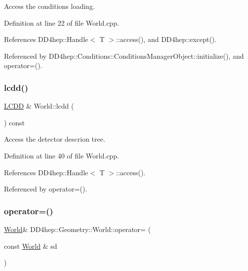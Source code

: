 Access the conditions loading. 



Definition at line 22 of file World.\+cpp.



References D\+D4hep\+::\+Handle$<$ T $>$\+::access(), and D\+D4hep\+::except().



Referenced by D\+D4hep\+::\+Conditions\+::\+Conditions\+Manager\+Object\+::initialize(), and operator=().

\hypertarget{class_d_d4hep_1_1_geometry_1_1_world_af4d8c997d8ada86ade18d953106dc301}{}\label{class_d_d4hep_1_1_geometry_1_1_world_af4d8c997d8ada86ade18d953106dc301} 
\subsubsection{\texorpdfstring{lcdd()}{lcdd()}}
{\footnotesize\ttfamily \hyperlink{class_d_d4hep_1_1_geometry_1_1_l_c_d_d}{L\+C\+DD} \& World\+::lcdd (\begin{DoxyParamCaption}{ }\end{DoxyParamCaption}) const}



Access the detector descrion tree. 



Definition at line 40 of file World.\+cpp.



References D\+D4hep\+::\+Handle$<$ T $>$\+::access().



Referenced by operator=().

\hypertarget{class_d_d4hep_1_1_geometry_1_1_world_a8bff84a367718e07ad1e34ac48711327}{}\label{class_d_d4hep_1_1_geometry_1_1_world_a8bff84a367718e07ad1e34ac48711327} 
\subsubsection{\texorpdfstring{operator=()}{operator=()}}
{\footnotesize\ttfamily \hyperlink{class_d_d4hep_1_1_geometry_1_1_world}{World}\& D\+D4hep\+::\+Geometry\+::\+World\+::operator= (\begin{DoxyParamCaption}\item[{const \hyperlink{class_d_d4hep_1_1_geometry_1_1_world}{World} \&}]{sd }\end{DoxyParamCaption})\hspace{0.3cm}{\ttfamily [inline]}}



